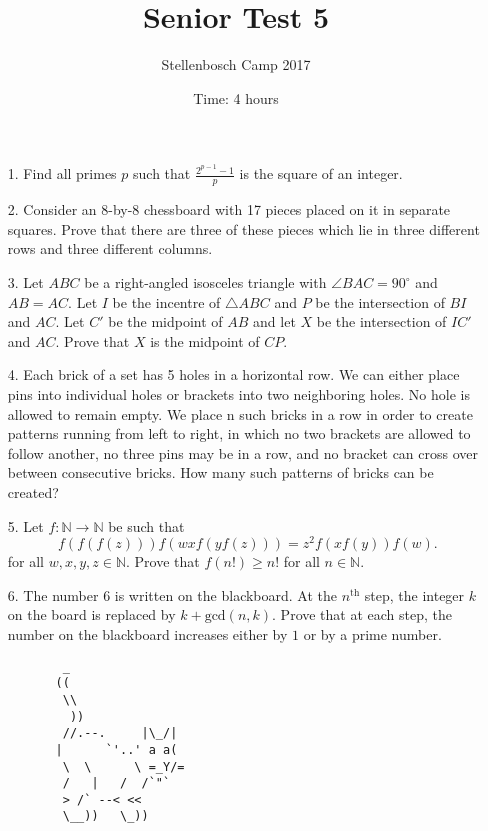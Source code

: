 \documentclass[12pt]{article}
\title{Senior Test 5}
\author{Stellenbosch Camp 2017}
\date{Time: 4 hours}
\begin{document}
 \maketitle

\begin{enumerate}

\item[1.] %
Find all primes $p$ such that $\displaystyle \frac{2^{p-1}-1}{p}$ is the square of an integer.


\item[2.] %
Consider an 8-by-8 chessboard with 17 pieces placed on it in separate squares. Prove that there are three of these pieces which lie in three different rows and three different columns.


\item[3.] %
Let $ABC$ be a right-angled isosceles triangle with $\angle BAC = 90^\circ$ and $AB = AC$. Let $I$ be the incentre of $\triangle ABC$ and $P$ be the intersection of $BI$ and $AC$. Let $C'$ be the midpoint of $AB$ and let $X$ be the intersection of $IC'$ and $AC$. Prove that $X$ is the midpoint of $CP$.


\item[4.] %
Each brick of a set has 5 holes in a horizontal row. We can either place pins into individual holes or brackets into two neighboring holes. No hole is allowed to remain empty. We place n such bricks in a row in order to create patterns running from left to right, in which no two brackets are allowed to follow another, no three pins may be in a row, and no bracket can cross over between consecutive bricks. How many such patterns of bricks can be created?


\item[5.] %
Let $f : \mathbb{N} \to \mathbb{N}$ be such that
  \[ f(f(f(z))) f(wx f(y f(z))) = z^2 f(xf(y)) f(w) .\]
for all $w, x, y, z \in \mathbb{N}$. Prove that $f(n!) \geq n!$ for all $n \in \mathbb{N}$.


\item[6.] %
The number $6$ is written on the blackboard. At the $n^\mathrm{th}$ step, the integer $k$ on the board is replaced by $k + \textrm{gcd}(n, k)$. Prove that at each step, the number on the blackboard increases either by $1$ or by a prime number.

\end{enumerate}

\vfill

\centering
\begin{BVerbatim}
           _ 
          ((
           \\
            ))       
           //.--.     |\_/|
          |      `'..' a a(
           \  \      \ =_Y/=
           /   |   /  /`"`
           > /` --< <<
           \__))   \_))
\end{BVerbatim}
\end{document}
